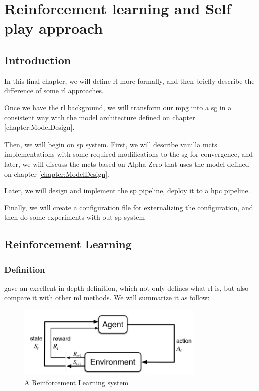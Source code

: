 \chapter{Reinforcement learning and Self play approach}
\section*{Introduction}

In this final chapter, we will define \acrfull{rl} more formally, and then briefly describe the difference of some \acrshort{rl} approaches.

Once we have the \acrshort{rl} background, we will transform our \acrshort{mpg} into a \acrfull{sg} in a consistent way with the model architecture defined on chapter \ref{chapter:ModelDesign}.

Then, we will begin on \acrfull{sp} system. First, we will describe vanilla \acrshort{mcts} implementations with some required modifications to the \acrshort{sg} for convergence, and later, we will discuss the \acrshort{mcts} based on Alpha Zero that uses the model defined on chapter \ref{chapter:ModelDesign}.

Later, we will design and implement the \acrshort{sp} pipeline, deploy it to a \acrshort{hpc} pipeline.

Finally, we will create a configuration file for externalizing the configuration, and then do some experiments with out \acrshort{sp} system 
\section{Reinforcement Learning}
\subsection{Definition}
\citeauthor{RLIntroduction} \cite[Chapter.~1]{RLIntroduction} gave an excellent in-depth definition, which not only defines what \acrfull{rl} is, but also compare it with other \acrfull{ml} methods.
\newline We will summarize it as follow:
\begin{definition}
	
\end{definition}
\begin{figure}
	\centering
	\includegraphics[width= 0.8\textwidth]{Figures/RLDiagram.png}
	\caption{A Reinforcement Learning system}
\end{figure}
